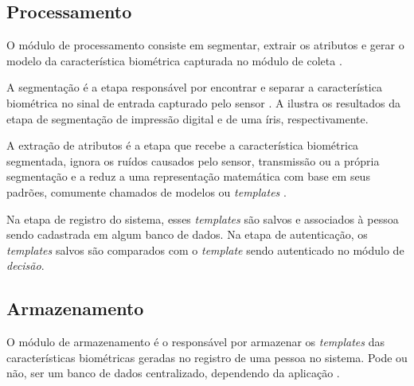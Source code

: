 \subsection{Processamento} \label{sec:sis_bio:processamento}

\par O módulo de processamento consiste em segmentar, extrair os atributos e gerar o modelo da característica biométrica capturada no módulo de coleta \cite{wayman2005biometric}.

\par A segmentação é a etapa responsável por encontrar e separar a característica biométrica no sinal de entrada capturado pelo sensor \cite{wayman2005biometric}. A  ilustra os resultados da etapa de segmentação de impressão digital e de uma íris, respectivamente.

\par A extração de atributos é a etapa que recebe a característica biométrica segmentada, ignora os ruídos causados pelo sensor, transmissão ou a própria segmentação e a reduz a uma representação matemática com base em seus padrões, comumente chamados de modelos ou \textit{templates} \cite{wayman2005biometric}.

\par Na etapa de registro do sistema, esses \textit{templates} são salvos e associados à pessoa sendo cadastrada em algum banco de dados. Na etapa de autenticação, os \textit{templates} salvos são comparados com o \textit{template} sendo autenticado no módulo de \textit{decisão}.


\subsection{Armazenamento}

\par O módulo de armazenamento é o responsável por armazenar os \textit{templates} das características biométricas geradas no registro de uma pessoa no sistema. Pode ou não, ser um banco de dados centralizado, dependendo da aplicação \cite{wayman2005biometric}.

